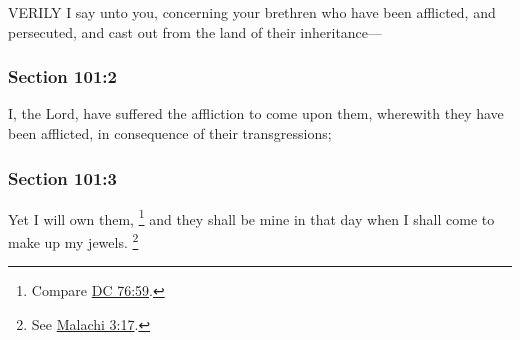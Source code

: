 		VERILY I say unto you, concerning your brethren who have been afflicted, and persecuted, and cast out from the land of their inheritance---


	\subsubsection{Section 101:2} %
		\label{DC101-2}

		I, the Lord, have suffered the affliction to come upon them, wherewith they have been afflicted, in consequence of their transgressions;


	\subsubsection{Section 101:3} %
		\label{DC101-3}

		Yet I will own them,%
			\footnote{%
				Compare \hyperref[DC76-59]{DC 76:59}.
				} 
		and they shall be mine in that day when I shall come to make up my jewels.%
			\footnote{%
				See \hyperref[MALACHI-3-17]{Malachi 3:17}.
				}


